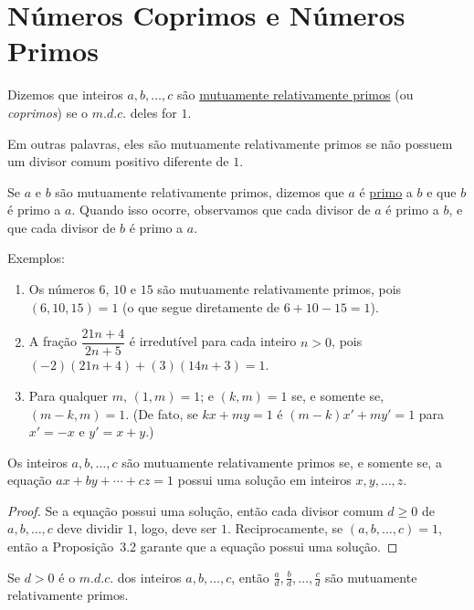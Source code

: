 \section{Números Coprimos e Números Primos}

\begin{definicao}
Dizemos que inteiros $a, b, \ldots, c$ são \underline{mutuamente relativamente primos} 
(ou \emph{coprimos}) se o $m.d.c.$ deles for $1$.
\end{definicao}

Em outras palavras, eles são mutuamente relativamente primos se não possuem 
um divisor comum positivo diferente de $1$.

Se $a$ e $b$ são mutuamente relativamente primos, dizemos que $a$ é \underline{primo} a $b$ 
e que $b$ é primo a $a$. Quando isso ocorre, observamos que cada divisor de $a$ 
é primo a $b$, e que cada divisor de $b$ é primo a $a$.

Exemplos:
\begin{enumerate}[left=0.5cm, align=left, nosep]
    \item Os números $6$, $10$ e $15$ são mutuamente relativamente primos, pois
    $(6,10,15) = 1$ (o que segue diretamente de $6 + 10 - 15 = 1$).
    
    \item A fração $\dfrac{21n + 4}{2n + 5}$ é irredutível para cada inteiro $n > 0$, pois
    $(-2)(21n + 4) + (3)(14n + 3) = 1$.
    
    \item Para qualquer $m$, $(1,m) = 1$; e $(k,m) = 1$ se, e somente se, $(m-k,m) = 1$.
    (De fato, se $kx + my = 1$ é $(m-k)x' + my' = 1$ para $x' = -x$ e $y' = x + y$.)
\end{enumerate}

\begin{proposicao}
Os inteiros $a, b, \ldots, c$ são mutuamente relativamente primos se, e somente se, 
a equação $ax + by + \cdots + cz = 1$ possui uma solução em inteiros $x, y, \ldots, z$.    
\end{proposicao}

\begin{proof}
Se a equação possui uma solução, então cada divisor comum $d \geq 0$ de 
$a, b, \ldots, c$ deve dividir $1$, logo, deve ser $1$. 
Reciprocamente, se $(a, b, \ldots, c) = 1$, então a Proposição~3.2 garante que 
a equação possui uma solução.
\end{proof}

\begin{corolario}
Se $d > 0$ é o $m.d.c.$ dos inteiros $a, b, \ldots, c$, então 
$\frac{a}{d}, \frac{b}{d}, \ldots, \frac{c}{d}$
são mutuamente relativamente primos.
\end{corolario}

